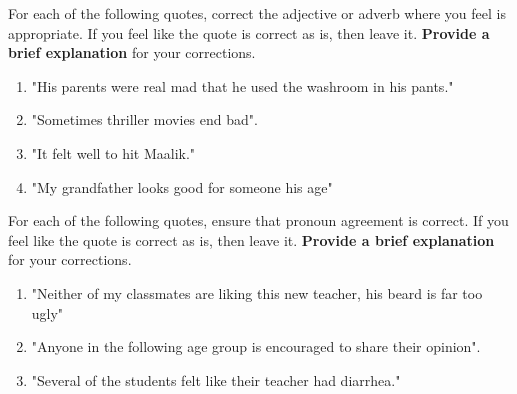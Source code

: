 \documentclass[12pt]{article} %
\begin{document}
\begin{qstn}[2]
  For each of the following quotes, correct the adjective or adverb where you feel is appropriate. If you feel like the quote
  is correct as is, then leave it. \textbf{Provide a brief explanation} for your corrections.
  
  \begin{enumerate}
    \item "His parents were real mad that he used the washroom in his pants."
      \vspace*{4cm}

    \item "Sometimes thriller movies end bad".
      \vspace*{4cm}
      
    \item "It felt well to hit Maalik."
      \vspace*{4cm}

    \item "My grandfather looks good for someone his age"
      \vspace*{4cm}

  \end{enumerate}
  
\end{qstn}

\begin{qstn}[3]
  For each of the following quotes, ensure that pronoun agreement is correct. If you feel like the quote
  is correct as is, then leave it. \textbf{Provide a brief explanation} for your corrections.

  \begin{enumerate}
    \item "Neither of my classmates are liking this new teacher, his beard is far too ugly"
      \vspace*{4cm}

    \item "Anyone in the following age group is encouraged to share their opinion".
      \vspace*{4cm}
      
    \item "Several of the students felt like their teacher had diarrhea."
      \vspace*{4cm}


  \end{enumerate}
\end{qstn}
\end{document}
